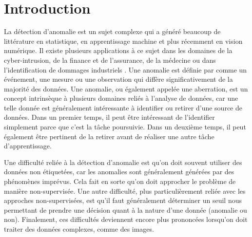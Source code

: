 \chapter*{Introduction}         %
\label{chap:introduction}       %


La détection d'anomalie est un sujet complexe qui a généré beaucoup de littérature en statistique,  en apprentissage machine et plus récemment en vision numérique. Il existe plusieurs applications à ce sujet dans les domaines de la cyber-intrusion, de la finance et de l'assurance, de la médecine ou dans l'identification de dommages industriels \citep{Chandola07anomalydetection:}. Une anomalie est définie par \cite{Zimek2017} comme un événement, une mesure ou une observation qui diffère significativement de la majorité des données. Une anomalie, ou également appelée une aberration, est un concept intrinsèque à plusieurs domaines reliés à l'analyse de données, car une telle donnée est généralement intéressante à identifier ou retirer d'une source de données. Dans un premier temps, il peut être intéressant de l'identifier simplement parce que c'est  la tâche poursuivie. Dans un deuxième temps, il peut également être pertinent de la retirer avant de réaliser une autre tâche d'apprentissage. 

Une difficulté reliée à la détection d'anomalie est qu'on doit souvent utiliser des données non étiquetées, car les anomalies sont généralement générées par des phénomènes imprévus. Cela fait en sorte qu'on doit approcher le problème de manière non-supervisée. Une autre difficulté, plus particulièrement reliée avec les approches non-supervisées, est qu'il faut généralement déterminer un seuil nous permettant de prendre une décision quant à la nature d'une donnée (anomalie ou non). Finalement, ces difficultés deviennent encore plus prononcées lorsqu'on doit traiter des données complexes, comme des images.

